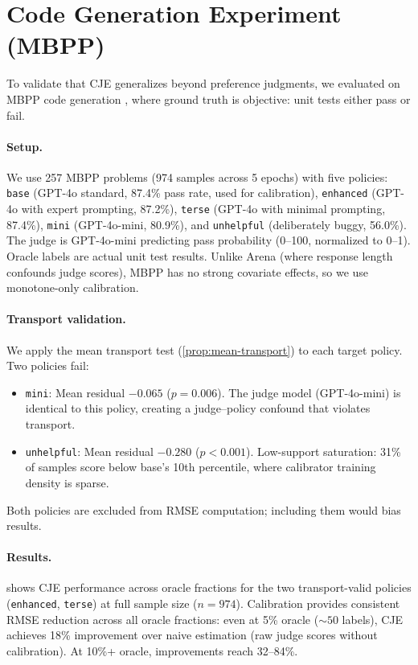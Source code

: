 \section{Code Generation Experiment (MBPP)}
\label{app:mbpp}

To validate that CJE generalizes beyond preference judgments, we evaluated on MBPP code generation \citep{Austin2021MBPP}, where ground truth is objective: unit tests either pass or fail.

\paragraph{Setup.}
We use 257 MBPP problems (974 samples across 5 epochs) with five policies: \texttt{base} (GPT-4o standard, 87.4\% pass rate, used for calibration), \texttt{enhanced} (GPT-4o with expert prompting, 87.2\%), \texttt{terse} (GPT-4o with minimal prompting, 87.4\%), \texttt{mini} (GPT-4o-mini, 80.9\%), and \texttt{unhelpful} (deliberately buggy, 56.0\%).
The judge is GPT-4o-mini predicting pass probability (0--100, normalized to 0--1).
Oracle labels are actual unit test results.
Unlike Arena (where response length confounds judge scores), MBPP has no strong covariate effects, so we use monotone-only calibration.

\paragraph{Transport validation.}
We apply the mean transport test (\cref{prop:mean-transport}) to each target policy. Two policies fail:
\begin{itemize}[leftmargin=*,nosep]
\item \texttt{mini}: Mean residual $-0.065$ ($p{=}0.006$). The judge model (GPT-4o-mini) is identical to this policy, creating a judge--policy confound that violates transport.
\item \texttt{unhelpful}: Mean residual $-0.280$ ($p{<}0.001$). Low-support saturation: 31\% of samples score below base's 10th percentile, where calibrator training density is sparse.
\end{itemize}
Both policies are excluded from RMSE computation; including them would bias results.

\paragraph{Results.}
 shows CJE performance across oracle fractions for the two transport-valid policies (\texttt{enhanced}, \texttt{terse}) at full sample size ($n{=}974$).
Calibration provides consistent RMSE reduction across all oracle fractions: even at 5\% oracle (${\sim}50$ labels), CJE achieves 18\% improvement over naive estimation (raw judge scores without calibration).
At 10\%+ oracle, improvements reach 32--84\%.

